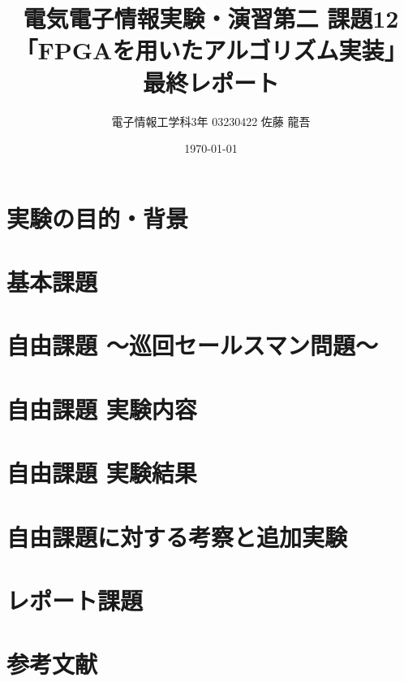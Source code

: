 \documentclass[dvipdfmx,10pt,a4paper,titlepage]{jsarticle}
\title{電気電子情報実験・演習第二 課題12\\「FPGAを用いたアルゴリズム実装」最終レポート}
\author{電子情報工学科3年 03230422 佐藤 龍吾}
\date{\today}
\begin{document}
\maketitle
\section{実験の目的・背景}

\section{基本課題}

\section{自由課題 ～巡回セールスマン問題～}

\section{自由課題 実験内容}

\section{自由課題 実験結果}

\section{自由課題に対する考察と追加実験}

\section{レポート課題}

\section{参考文献}

\end{document}
